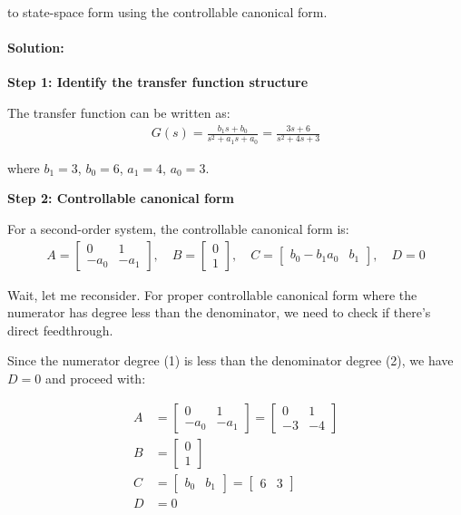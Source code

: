 \documentclass[11pt,a4paper]{article}
\begin{document}
to state-space form using the controllable canonical form.

\paragraph{Solution:}

\textbf{Step 1: Identify the transfer function structure}

The transfer function can be written as:
\begin{align}
G(s) = \frac{b_1 s + b_0}{s^2 + a_1 s + a_0} = \frac{3s + 6}{s^2 + 4s + 3}
\end{align}

where $b_1 = 3$, $b_0 = 6$, $a_1 = 4$, $a_0 = 3$.

\textbf{Step 2: Controllable canonical form}

For a second-order system, the controllable canonical form is:
\begin{align}
A = \begin{bmatrix} 0 & 1 \\ -a_0 & -a_1 \end{bmatrix}, \quad B = \begin{bmatrix} 0 \\ 1 \end{bmatrix}, \quad C = \begin{bmatrix} b_0 - b_1 a_0 & b_1 \end{bmatrix}, \quad D = 0
\end{align}

Wait, let me reconsider. For proper controllable canonical form where the numerator has degree less than the denominator, we need to check if there's direct feedthrough.

Since the numerator degree (1) is less than the denominator degree (2), we have $D = 0$ and proceed with:

\begin{align}
A &= \begin{bmatrix} 0 & 1 \\ -a_0 & -a_1 \end{bmatrix} = \begin{bmatrix} 0 & 1 \\ -3 & -4 \end{bmatrix} \\
B &= \begin{bmatrix} 0 \\ 1 \end{bmatrix} \\
C &= \begin{bmatrix} b_0 & b_1 \end{bmatrix} = \begin{bmatrix} 6 & 3 \end{bmatrix} \\
D &= 0
\end{align}
\end{document}
